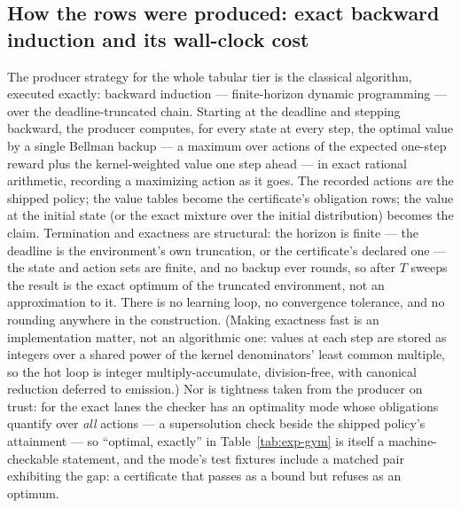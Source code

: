 \subsection{How the rows were produced: exact backward induction
and its wall-clock cost}
\label{sec:exp-gym-producer}

The producer strategy for the whole tabular tier is the classical
algorithm, executed exactly: backward induction --- finite-horizon
dynamic programming --- over the deadline-truncated chain. Starting
at the deadline and stepping backward, the producer computes, for
every state at every step, the optimal value by a single Bellman
backup --- a maximum over actions of the expected one-step reward
plus the kernel-weighted value one step ahead --- in exact rational
arithmetic, recording a maximizing action as it goes. The
recorded actions \emph{are} the shipped policy; the value tables
become the certificate's obligation rows; the value at the initial
state (or the exact mixture over the initial distribution) becomes
the claim. Termination and exactness are structural: the horizon is
finite --- the deadline is the environment's own truncation, or the
certificate's declared one --- the state and action sets are finite,
and no backup ever rounds, so after $T$ sweeps the result is the
exact optimum of the truncated environment, not an approximation to
it. There is no learning loop, no convergence tolerance, and no
rounding anywhere in the construction. (Making exactness fast is an
implementation matter, not an algorithmic one: values at each step
are stored as integers over a shared power of the kernel
denominators' least common multiple, so the hot loop is
integer multiply-accumulate, division-free, with canonical reduction
deferred to emission.) Nor is tightness taken from the producer on
trust: for the exact lanes the checker has an optimality mode whose
obligations quantify over \emph{all} actions --- a supersolution
check beside the shipped policy's attainment --- so ``optimal,
exactly'' in Table~\ref{tab:exp-gym} is itself a machine-checkable
statement, and the mode's test fixtures include a matched pair
exhibiting the gap: a certificate that passes as a bound but refuses
as an optimum.

